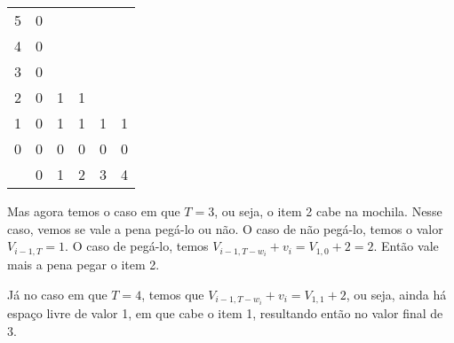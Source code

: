\begin{example}
	\begin{center}
		\begin{tabular}{c|c|c|c|c|c|}
			\cline{2-6}
			5                                              & 0                     &                       &                       &                       &                       \\ \cline{2-6}
			4                                              & 0                     &                       &                       &                       &                       \\ \cline{2-6}
			3                                              & 0                     &                       &                       &                       &                       \\ \cline{2-6}
			2                                              & 0                     & 1                     & 1                     &                       &                       \\ \cline{2-6}
			1                                              & 0                     & 1                     & 1                     & 1                     & 1                     \\ \cline{2-6}
			0                                              & 0                     & 0                     & 0                     & 0                     & 0                     \\ \cline{2-6}
			\multicolumn{1}{c}{\diagbox[dir=NE]{$i$}{$T$}} & \multicolumn{1}{c}{0} & \multicolumn{1}{c}{1} & \multicolumn{1}{c}{2} & \multicolumn{1}{c}{3} & \multicolumn{1}{c}{4}
		\end{tabular}
	\end{center}

	Mas agora temos o caso em que $T=3$, ou seja, o item 2 cabe na mochila. Nesse caso, vemos se vale a pena pegá-lo ou não. O caso de não pegá-lo, temos o valor $V_{i-1, T} = 1$. O caso de pegá-lo, temos $V_{i-1,  T-w_i}+v_i = V_{1, 0} + 2 = 2$. Então vale mais a pena pegar o item 2.

	Já no caso em que $T=4$, temos que $V_{i-1, T-w_i}+v_i = V_{1, 1} + 2$, ou seja, ainda há espaço livre de valor 1, em que cabe o item 1, resultando então no valor final de 3.


\end{example}
